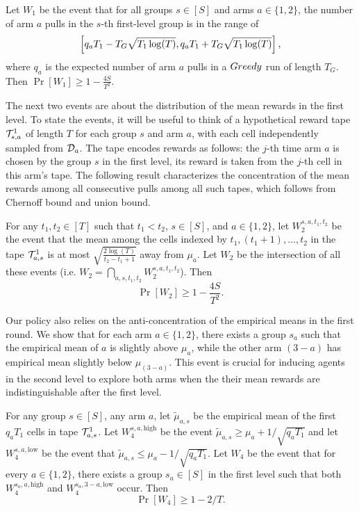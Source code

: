 \begin{lemma}\label{3levelw1}
  Let $W_1$ be the event that for all groups $s\in [S]$ and arms
  $a\in \{1, 2\}$, the number of arm $a$ pulls in the $s$-th
  first-level group is in the range of
  $$
  \left[q_a T_1- T_G \sqrt{T_1\log(T)}, q_a T_1 + T_G \sqrt{T_1\log(T)}\right],
  $$
  where $q_a$ is the expected number of arm $a$ pulls in a $Greedy$ run
  of length $T_G$. Then $\Pr[W_1] \geq 1- \frac{4S}{T^2}$.
\end{lemma}


The next two events are about the distribution of the mean rewards in
the first level. To state the events, it will be useful to think of a
hypothetical reward tape $\mathcal{T}^1_{s, a}$ of length $T$ for each
group $s$ and arm $a$, with each cell independently sampled from
$\mathcal{D}_a$.  The tape encodes rewards as follows: the $j$-th time arm $a$
is chosen by the group $s$ in the first level, its reward is taken
from the $j$-th cell in this arm's tape. The following result
characterizes the concentration of the mean rewards among all
consecutive pulls among all such tapes, which follows from Chernoff
bound and union bound.

\begin{lemma}\label{3levelw2}
  For any $t_1, t_2\in [T]$ such that $t_1 < t_2$, $s\in [S]$, and
  $a\in \{1,2\}$, let $W_2^{s,a,t_1,t_2}$ be the event that the mean
  among the cells indexed by $t_1, (t_1+1), \ldots, t_2$ in the tape
  $\mathcal{T}^1_{a, s}$ is at most $\sqrt{\frac{2\log(T)}{t_2-t_1+1}}$ away
  from $\mu_a$.  Let $W_2$ be the intersection of all these events
  (i.e.  $W_2 = \bigcap_{a,s,t_1,t_2} W_2^{s,a,t_1,t_2}$). Then
  \[
    \Pr[W_2] \geq 1- \frac{4S}{T^2}.
  \]
\end{lemma}

Our policy also relies on the anti-concentration of the empirical
means in the first round. We show that for each arm $a\in \{1, 2\}$,
there exists a group $s_a$ such that the empirical mean of $a$ is
slightly above $\mu_a$, while the other arm $(3 - a)$ has empirical
mean slightly below $\mu_{(3-a)}$. This event is crucial for inducing
agents in the second level to explore both arms when the their
mean rewards are indistinguishable after the first level.


\begin{lemma}\label{3levelw4}
  For any group $s\in [S]$, any arm $a$, let $\tilde\mu_{a,s}$ be the
  empirical mean of the first $q_a T_1$ cells in tape $\mathcal{T}^1_{a, s}$.
  Let $W_4^{s,a,\text{high}}$ be the event
  $\tilde\mu_{a, s} \geq \mu_a + 1/\sqrt{q_a T_1}$ and let
  $W_4^{s,a,\text{low}}$ be the event that
  $\tilde\mu_{a, s} \leq \mu_a - 1/\sqrt{q_a T_1}$.  Let $W_4$ be the
  event that for every $a\in \{1, 2\}$, there exists a group
  $s_a\in [S]$ in the first level such that both $W_4^{s_a,a,\text{high}}$
  and $W_4^{s_a,3-a,\text{low}}$ occur. Then
  \[
    \Pr[W_4]\geq 1 -2 /T.
  \]
\end{lemma}




